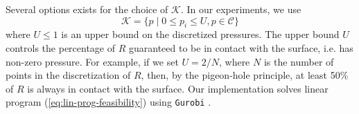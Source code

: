 \documentclass[conference]{IEEEtran}
\begin{document}
Several options exists for the choice of $\mathcal{K}$. 
In our experiments, we use
\begin{equation}
  \mathcal{K} = \{p\;|\; 0 \leq p_i \leq U, p \in \mathcal{C}\} \label{eq:upper-bound-pressures}
\end{equation}
where $U \leq 1$ is an upper bound on the discretized pressures. The
upper bound $U$ controls the percentage of $R$ guaranteed to be in
contact with the surface, i.e. has non-zero pressure. For example, if
we set $U = 2/N$, where $N$ is the number of points in the
discretization of $R$, then, by the pigeon-hole principle, at least
50\% of $R$ is always in contact with the surface. Our implementation
solves linear program (\ref{eq:lin-prog-feasibility}) using
\texttt{Gurobi} \cite{gurobi}.





\end{document}
